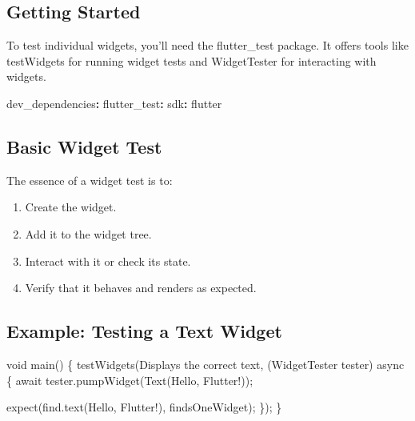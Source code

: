 \documentclass[
]{article}
\newenvironment{Shaded}{\begin{snugshade}}{\end{snugshade}}
\newcommand{\AttributeTok}[1]{\textcolor[rgb]{0.16,0.50,0.73}{#1}}
\newcommand{\DataTypeTok}[1]{\textcolor[rgb]{0.16,0.50,0.73}{#1}}
\newcommand{\FunctionTok}[1]{\textcolor[rgb]{0.56,0.27,0.68}{#1}}
\newcommand{\KeywordTok}[1]{\textcolor[rgb]{0.81,0.81,0.76}{\textbf{#1}}}
\newcommand{\NormalTok}[1]{\textcolor[rgb]{0.81,0.81,0.76}{#1}}
\newcommand{\OperatorTok}[1]{\textcolor[rgb]{0.81,0.81,0.76}{#1}}
\newcommand{\StringTok}[1]{\textcolor[rgb]{0.96,0.31,0.31}{#1}}
\providecommand{\tightlist}{%
  \setlength{\itemsep}{0pt}\setlength{\parskip}{0pt}}
\begin{document}
\subsection{Getting Started}\label{getting-started}

To test individual widgets, you'll need the flutter\_test package. It
offers tools like testWidgets for running widget tests and WidgetTester
for interacting with widgets.

\begin{Shaded}
\begin{Highlighting}[]
\FunctionTok{dev\_dependencies}\KeywordTok{:}
\AttributeTok{  }\FunctionTok{flutter\_test}\KeywordTok{:}
\AttributeTok{    }\FunctionTok{sdk}\KeywordTok{:}\AttributeTok{ flutter}
\end{Highlighting}
\end{Shaded}

\subsection{Basic Widget Test}\label{basic-widget-test}

The essence of a widget test is to:

\begin{enumerate}
\def\labelenumi{\arabic{enumi}.}
\tightlist
\item
  Create the widget.
\item
  Add it to the widget tree.
\item
  Interact with it or check its state.
\item
  Verify that it behaves and renders as expected.
\end{enumerate}

\subsection{Example: Testing a Text
Widget}\label{example-testing-a-text-widget}

\begin{Shaded}
\begin{Highlighting}[]
\DataTypeTok{void}\NormalTok{ main() }\OperatorTok{\{}
\NormalTok{  testWidgets(}\StringTok{\textquotesingle{}Displays the correct text\textquotesingle{}}\OperatorTok{,}\NormalTok{ (WidgetTester tester) }\AttributeTok{async} \OperatorTok{\{}
    \AttributeTok{await}\NormalTok{ tester}\OperatorTok{.}\NormalTok{pumpWidget(Text(}\StringTok{\textquotesingle{}Hello, Flutter!\textquotesingle{}}\NormalTok{));}

\NormalTok{    expect(find}\OperatorTok{.}\NormalTok{text(}\StringTok{\textquotesingle{}Hello, Flutter!\textquotesingle{}}\NormalTok{)}\OperatorTok{,}\NormalTok{ findsOneWidget);}
  \OperatorTok{\}}\NormalTok{);}
\OperatorTok{\}}
\end{Highlighting}
\end{Shaded}
\end{document}
